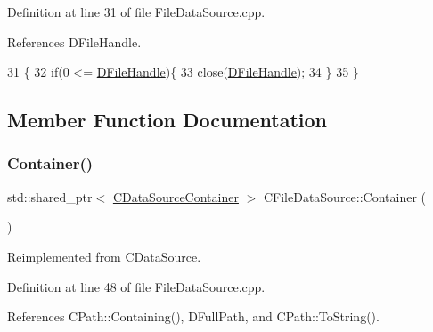 Definition at line 31 of file File\+Data\+Source.\+cpp.



References D\+File\+Handle.


\begin{DoxyCode}
31                                  \{
32     \textcolor{keywordflow}{if}(0 <= \hyperlink{classCFileDataSource_abad036de6dfe018ddc6160a2026a401d}{DFileHandle})\{
33         close(\hyperlink{classCFileDataSource_abad036de6dfe018ddc6160a2026a401d}{DFileHandle});   
34     \}
35 \}
\end{DoxyCode}


\subsection{Member Function Documentation}
\hypertarget{classCFileDataSource_a2492b88ea8186c4cbd4bdfa92060f5fa}{}\label{classCFileDataSource_a2492b88ea8186c4cbd4bdfa92060f5fa} 
\subsubsection{\texorpdfstring{Container()}{Container()}}
{\footnotesize\ttfamily std\+::shared\+\_\+ptr$<$ \hyperlink{classCDataSourceContainer}{C\+Data\+Source\+Container} $>$ C\+File\+Data\+Source\+::\+Container (\begin{DoxyParamCaption}{ }\end{DoxyParamCaption})\hspace{0.3cm}{\ttfamily [virtual]}}



Reimplemented from \hyperlink{classCDataSource_ada14cfe01c850d01b23c9b49d2f65efc}{C\+Data\+Source}.



Definition at line 48 of file File\+Data\+Source.\+cpp.



References C\+Path\+::\+Containing(), D\+Full\+Path, and C\+Path\+::\+To\+String().


